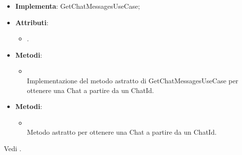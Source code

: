 \documentclass[10pt, a4paper]{article}
\begin{document}
\label{GetChatMessagesServiceDettaglio}
\begin{itemize}
    \item \textbf{Implementa}: GetChatMessagesUseCase;
    \item \textbf{Attributi}:
    \begin{itemize}
        \item {}.
    \end{itemize}
    \item \textbf{Metodi}:
    \begin{itemize}
        \item {}\\
        Implementazione del metodo astratto di GetChatMessagesUseCase per ottenere una Chat a partire da un ChatId.
    \end{itemize}
\end{itemize}

\label{GetChatMessagesUseCaseDettaglio}
\begin{itemize}
    \item \textbf{Metodi}:
    \begin{itemize}
        \item {}\\
        Metodo astratto per ottenere una Chat a partire da un ChatId.
    \end{itemize}
\end{itemize}


\begin{comment}
    

\subsubsubsection{ChatInfo}
\label{ChatInfoDettaglio}
\begin{itemize}
    \item \textbf{Attributi}:
    \begin{itemize}
        \item \code{chatId: ChatId}
        \item \code{title: string};
        \item \code{timestamp: timestamp}.
    \end{itemize}
\end{itemize}

\end{comment}



Vedi .
\end{document}
